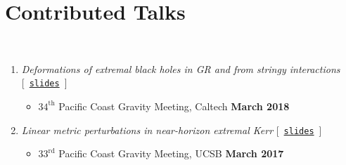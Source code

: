 
\section*{\sc Contributed Talks}~
\vspace{-.2in}

\begin{enumerate}

    \item {\it Deformations of extremal black holes in GR and from stringy interactions} \hfill
    [~\href{http://fermionic.me/talk-slides/Stringy%40PCGM.pdf}{{\tt slides}}~]
    \begin{itemize}
     \item[] $34^\mathrm{th}$ Pacific Coast Gravity Meeting, Caltech
       \hfill  {\bf March 2018} 
    \end{itemize}

    \item {\it Linear metric perturbations in near-horizon extremal Kerr} \hfill
    [~\href{http://fermionic.me/talk-slides/NHEK%40PCGM.pdf}{{\tt slides}}~]
    \begin{itemize}
     \item[] $33^\mathrm{rd}$ Pacific Coast Gravity Meeting, UCSB
       \hfill {\bf March 2017}
    \end{itemize}
    

\end{enumerate}
